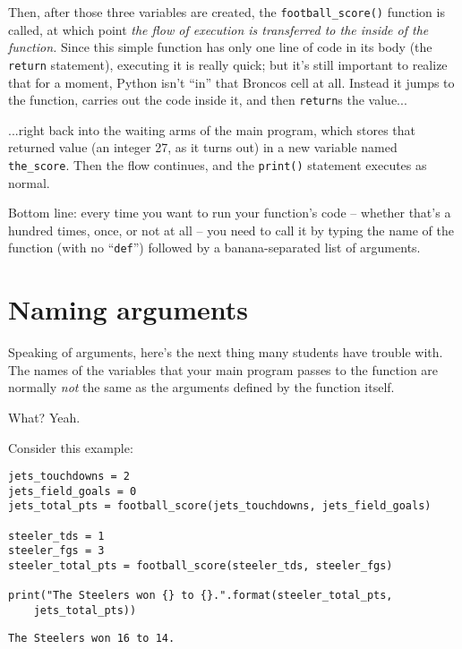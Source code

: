 Then, after those three variables are created, the \texttt{football\_score()}
function is called, at which point \textit{the flow of execution is transferred
to the inside of the function.} Since this simple function has only one line of
code in its body (the \texttt{return} statement), executing it is really quick;
but it's still important to realize that for a moment, Python isn't ``in'' that
Broncos cell at all. Instead it jumps to the function, carries out the code
inside it, and then \texttt{return}s the value...

...right back into the waiting arms of the main program, which stores that
returned value (an integer 27, as it turns out) in a new variable named
\texttt{the\_score}. Then the flow continues, and the \texttt{print()}
statement executes as normal.

Bottom line: every time you want to run your function's code -- whether that's
a hundred times, once, or not at all -- you need to call it by typing the name
of the function (with no ``\texttt{def}'') followed by a banana-separated list
of arguments.

\section{Naming arguments}


Speaking of arguments, here's the next thing many students have trouble with.
The names of the variables that your main program passes to the function are
normally \textit{not} the same as the arguments defined by the function itself.

What? Yeah.

Consider this example:

\begin{Verbatim}[fontsize=\small,samepage=true,frame=single,framesep=3mm]
jets_touchdowns = 2
jets_field_goals = 0
jets_total_pts = football_score(jets_touchdowns, jets_field_goals)

steeler_tds = 1
steeler_fgs = 3
steeler_total_pts = football_score(steeler_tds, steeler_fgs)

print("The Steelers won {} to {}.".format(steeler_total_pts,
    jets_total_pts))
\end{Verbatim}
\vspace{-.2in}

\begin{Verbatim}[fontsize=\small,samepage=true,frame=leftline,framesep=5mm,framerule=1mm]
The Steelers won 16 to 14.
\end{Verbatim}

